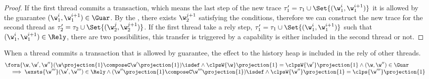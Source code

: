 \begin{proof}
If the first thread commits a transaction, which means the last step of the new trace \( \tau_{1}' = \tau_{1} \cup \Set{(\w_{1}^{i}, \w_{1}^{i+1})} \) it is allowed by the guarantee \( (\w_{1}^{i}, \w_{1}^{i+1}) \in \Guar \).
By the , there exists \( \w_{2}^{j+1} \) satisfying the conditions, therefore we can construct the new trace for the second thread as \( \tau_{2}' = \tau_{2} \cup \Set{(\w_{2}^{j},\w_{2}^{j+1})} \).
If the first thread take a rely step, \ie \( \tau_{1}' = \tau_{1} \cup \Set{(\w_{1}^{i}, \w_{1}^{i+1})} \) such that \( (\w_{1}^{i}, \w_{1}^{i+1}) \in \Rely \), there are two possibilities, this transfer is triggered by a capability is either included in the second thread or not.
\end{proof}

\begin{lem}
When a thread commits a transaction that is allowed by guarantee, the effect to the history heap is included in the rely of other threads.
\label{lem:locality-update}
\[
\begin{array}{@{}l}
    \fora{\w, \w', \w''} (\w\projection{1} \composeC \w'\projection{1})\isdef \land \clpsW{\w}\projection{1} = \clpsW{\w'}\projection{1} \land (\w, \w'') \in \Guar  \\
    \quad \implies \exsts{\w'''} (\w', \w''') \in \Rely \land (\w''\projection{1} \composeC \w'''\projection{1})\isdef \land \clpsW{\w''}\projection{1} = \clps{\w'''}\projection{1}
\end{array} 
\]
\end{lem}
